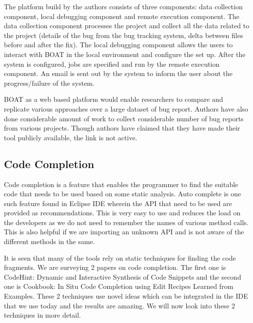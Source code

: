 \documentclass[10pt, conference, compsocconf]{IEEEtran}
\begin{document}
The platform build by the authors consists of three components: data collection component, local debugging component and remote execution component. The data collection component processes the project and collect all the data related to the project (details of the bug from the bug tracking system, delta between files before and after the fix). The local debugging component allows the users to interact with BOAT in the local environment and configure the set up. After the system is configured, jobs are specified and run by the remote execution component. An email is sent out by the system to inform the user about the progress/failure of the system.

BOAT as a web based platform would enable researchers to compare and replicate various approaches over a large dataset of bug report. Authors have also done considerable amount of work to collect considerable number of bug reports from various projects. Though authors have claimed that they have made their tool publicly available, the link is not active. 

\subsection{Code Completion}
Code completion is a feature that enables the programmer to find the suitable code that needs to be used  based on some static 
analysis. Auto complete is one such feature found in Eclipse IDE wherein the API that need to be used are provided as recommendations.
This is very easy to use and reduces the load on the developers as we do not need to remember the names of various method calls. This is also helpful if we are importing an unknown API and is not aware of the different methods in the same.

It is seen that many of the tools rely on static techniques for finding the code fragments. We are surveying 2 papers on code completion. The first one is  CodeHint: Dynamic and Interactive Synthesis of Code Snippets\cite{galenson2014codehint} and the second one is Cookbook: In Situ Code Completion using Edit Recipes Learned from Examples\cite{jacobellis2014cookbook}. These 2 techniques use novel ideas which can be integrated in the IDE that we use today and the results are amazing. We will now look into these 2 techniques in more detail.
\end{document}
